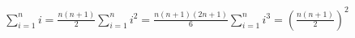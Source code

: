 \documentclass[preview]{standalone}
\begin{document}
\begin{align*}
\sum_{i=1}^{n} i = \frac{n(n+1)}{2} \sum_{i=1}^{n} i^2 = \frac{n(n+1)(2n+1)}{6} \sum_{i=1}^{n} i^3 = \left(\frac{n(n+1)}{2}\right)^2
\end{align*}
\end{document}
